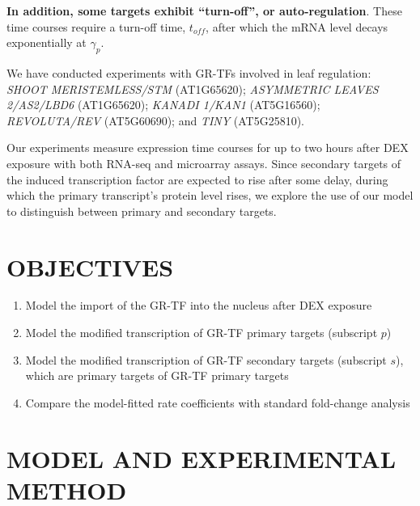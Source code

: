 \documentclass[aspb,landscape]{a0poster}
\begin{document}
\begin{multicols}{4}
  \textbf{In addition, some targets exhibit ``turn-off'', or auto-regulation}. These time courses require a turn-off time, $t_{off}$, after which the mRNA level decays exponentially at $\gamma_p$.
  
  We have conducted experiments with GR-TFs involved in leaf regulation: 
  \textit{SHOOT MERISTEMLESS/STM} (AT1G65620);
  \textit{ASYMMETRIC LEAVES 2/AS2/LBD6} (AT1G65620);
  \textit{KANADI 1/KAN1} (AT5G16560); 
  \textit{REVOLUTA/REV} (AT5G60690); and 
  \textit{TINY} (AT5G25810).
  
  Our experiments measure expression time courses for up to two hours after DEX exposure with both RNA-seq and microarray assays.
  Since secondary targets of the induced transcription factor are expected to rise after some delay, during which the primary transcript's protein level rises,
  we explore the use of our model to distinguish between primary and secondary targets.
  

  \section*{OBJECTIVES}
  \color{CarnegiePriBlue}  

  \begin{enumerate}
  \item Model the import of the GR-TF into the nucleus after DEX exposure
  \item Model the modified transcription of GR-TF primary targets (subscript $p$)
  \item Model the modified transcription of GR-TF secondary targets (subscript $s$), which are primary targets of GR-TF primary targets
  \item Compare the model-fitted rate coefficients with standard fold-change analysis
  \end{enumerate}

  \color{Black}


  \section*{MODEL AND EXPERIMENTAL METHOD}


\end{multicols}
\end{document}
